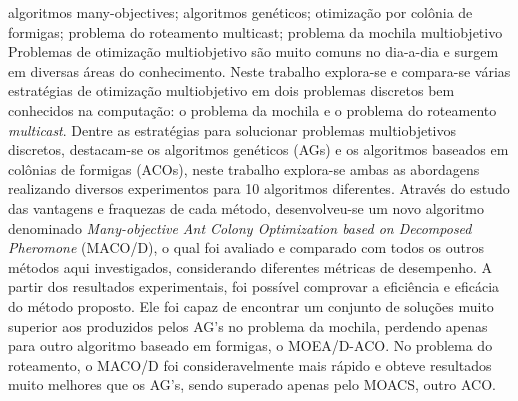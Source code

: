 \documentclass[dissertmst]{ppgco}
\begin{document}
\begin{resumo}{algoritmos many-objectives; algoritmos genéticos; otimização por colônia de formigas; problema do roteamento multicast; problema da mochila multiobjetivo}
	Problemas de otimização multiobjetivo são muito comuns no dia-a-dia e surgem em diversas áreas do conhecimento. Neste trabalho explora-se e compara-se várias estratégias de otimização multiobjetivo em dois problemas discretos bem conhecidos na computação: o problema da mochila e o problema do roteamento \textit{multicast}. Dentre as estratégias para solucionar problemas multiobjetivos discretos, destacam-se os algoritmos genéticos (AGs) e os algoritmos baseados em colônias de formigas (ACOs), neste trabalho explora-se ambas as abordagens realizando diversos experimentos para 10 algoritmos diferentes. Através do estudo das vantagens e fraquezas de cada método, desenvolveu-se um novo algoritmo denominado \textit{Many-objective Ant Colony Optimization based on Decomposed Pheromone} (MACO/D), o qual foi avaliado e comparado com todos os outros métodos aqui investigados, considerando diferentes métricas de desempenho. A partir dos resultados experimentais, foi possível comprovar a eficiência e eficácia do método proposto. Ele foi capaz de encontrar um conjunto de soluções muito superior aos produzidos pelos AG's no problema da mochila, perdendo apenas para outro algoritmo baseado em formigas, o MOEA/D-ACO. No problema do roteamento, o MACO/D foi consideravelmente mais rápido e obteve resultados muito melhores que os AG's, sendo superado apenas pelo MOACS, outro ACO.
\end{resumo}

\begin{abstract}{many-objective algorithms; genetic algorithms; ant colony optimization; multicast routing problem; multi-objective knapsack problem}
	Multi-objective optimization problems are very common in the day-to-day life and come up in many fields of knowledge. In this work, several strategies for multi-objective optimization have been explored and compared in two well known discrete problems in computer science: the knapsack problem and the multicast routing problem. Among all strategies to solve multi-objective discrete problems, genetic algorithms (GAs) and ant colony optimization (ACO) are the ones who generally provide the best results. In this work both approaches are explored through several experiments involving 10 different algorithms. As a consequence of studying the strengths and weaknesses of each method, a new algorithm has been proposed, the Many-objective Ant Colony Optimization based on Decomposed Pheromone (MACO/D), which has been evaluated and compared against all other methods investigated here, considering different performance metrics. It has been capable of finding much superior sets of solutions than the ones yielded by the GAs in the knapsack problem, losing only to another algorithm based on ant colonies, the MOEA/D-ACO. In the routing problem, MACO/D was considerably faster and obtained much better results than any GA, being surpassed only by MOACS, another ACO.
\end{abstract}
\end{document}
